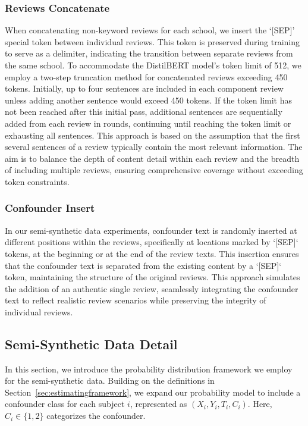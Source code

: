 \documentclass[11pt]{article}
\begin{document}
\subsubsection{Reviews Concatenate}
When concatenating non-keyword reviews for each school, we insert the ‘[SEP]’ special token between individual reviews. This token is preserved during training to serve as a delimiter, indicating the transition between separate reviews from the same school. To accommodate the DistilBERT model's token limit of 512, we employ a two-step truncation method for concatenated reviews exceeding 450 tokens. Initially, up to four sentences are included in each component review unless adding another sentence would exceed 450 tokens. If the token limit has not been reached after this initial pass, additional sentences are sequentially added from each review in rounds, continuing until reaching the token limit or exhausting all sentences. This approach is based on the assumption that the first several sentences of a review typically contain the most relevant information. The aim is to balance the depth of content detail within each review and the breadth of including multiple reviews, ensuring comprehensive coverage without exceeding token constraints.

\subsubsection{Confounder Insert}
In our semi-synthetic data experiments, confounder text is randomly inserted at different positions within the reviews, specifically at locations marked by `[SEP]` tokens, at the beginning or at the end of the review texts. This insertion ensures that the confounder text is separated from the existing content by a `[SEP]` token, maintaining the structure of the original reviews. This approach simulates the addition of an authentic single review, seamlessly integrating the confounder text to reflect realistic review scenarios while preserving the integrity of individual reviews.



\subsection{Semi-Synthetic Data Detail}
\label{sec:semi-synthetic_Data_appendix}

In this section, we introduce the probability distribution framework we employ for the semi-synthetic data. Building on the definitions in Section~\ref{sec:estimatingframework}, we expand our probability model to include a confounder class for each subject $i$, represented as $(X_i, Y_i, T_i, C_i)$. Here, $C_i \in \{1, 2\}$ categorizes the confounder. 
\end{document}
